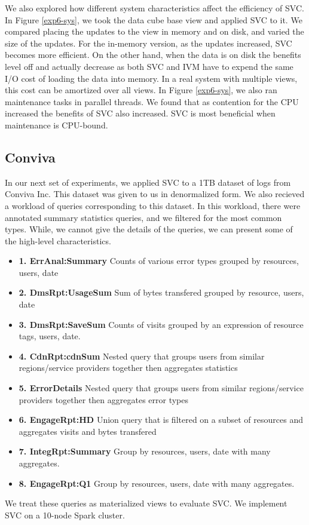 We also explored how different system characteristics affect the efficiency of SVC.
In Figure \ref{exp6-sys}, we took the data cube base view and applied SVC to it.
We compared placing the updates to the view in memory and on disk, and varied the size of the updates.
For the in-memory version, as the updates increased, SVC becomes more efficient.
On the other hand, when the data is on disk the benefits level off and actually decrease as both SVC and IVM have to 
expend the same I/O cost of loading the data into memory.
In a real system with multiple views, this cost can be amortized over all views.
In Figure \ref{exp6-sys}, we also ran maintenance tasks in parallel threads.
We found that as contention for the CPU increased the benefits of SVC also increased.
SVC is most beneficial when maintenance is CPU-bound.

\subsection{Conviva}
In our next set of experiments, we applied SVC to a 1TB dataset of logs from Conviva Inc.
This dataset was given to us in denormalized form.
We also recieved a workload of queries corresponding to this dataset.
In this workload, there were annotated summary statistics queries, and we filtered for the most common types.
While, we cannot give the details of the queries, we can present some of the high-level characteristics.
\begin{itemize}
\item \textbf{1. ErrAnal:Summary} Counts of various error types grouped by resources, users, date
\item \textbf{2. DmsRpt:UsageSum} Sum of bytes transfered grouped by resource, users, date
\item \textbf{3. DmsRpt:SaveSum} Counts of visits grouped by an expression of resource tags, users, date.
\item \textbf{4. CdnRpt:cdnSum} Nested query that groups users from similar regions/service providers together then aggregates statistics
\item \textbf{5. ErrorDetails} Nested query that groups users from similar regions/service providers together then aggregates error types
\item \textbf{6. EngageRpt:HD} Union query that is filtered on a subset of resources and aggregates visits and bytes transfered
\item \textbf{7. IntegRpt:Summary} Group by resources, users, date with many aggregates.
\item \textbf{8. EngageRpt:Q1} Group by resources, users, date with many aggregates.
\end{itemize}
We treat these queries as materialized views to evaluate SVC.
We implement SVC on a 10-node Spark cluster.

